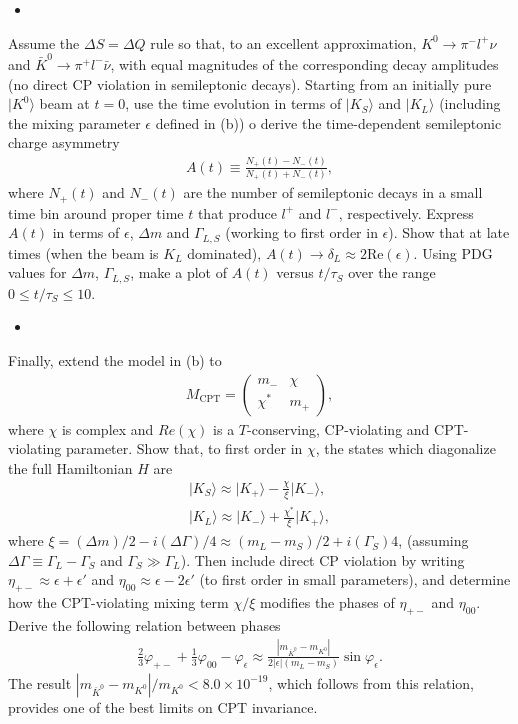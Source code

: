 \begin{itemize}
    \item [(c)]
\end{itemize}
Assume the $\Delta S = \Delta Q$ rule so that, to an excellent approximation, $K^0\to \pi^- l^+ \nu$ and $\bar{K}^0\to \pi^+ l^- \bar{\nu}$, with equal magnitudes of the corresponding decay amplitudes (no direct CP violation in semileptonic decays). Starting from an initially pure $|K^0\rangle$ beam at $t=0$, use the time evolution in terms of $|K_S\rangle$ and $|K_L\rangle$ (including the mixing parameter $\epsilon$ defined in (b)) o derive the time-dependent semileptonic charge asymmetry 
\begin{align}
    A(t)\equiv \frac{N_+(t)-N_-(t)}{N_+(t)+N_-(t)},
\end{align}
where $N_+(t)$ and $N_-(t)$ are the number of semileptonic decays in a small time bin around proper time $t$ that produce $l^+$ and $l^-$, respectively. Express $A(t)$ in terms of $\epsilon$, $\Delta m$ and $\Gamma_{L,S}$ (working to first order in $\epsilon$). Show that at late times (when the beam is $K_L$ dominated), $A(t)\to\delta_L\approx 2\text{Re}(\epsilon)$. Using PDG values for $\Delta m$, $\Gamma_{L,S}$, make a plot of $A(t)$ versus $t/\tau_S$ over the range $0\leq t/\tau_S \leq 10$.

\begin{itemize}
    \item [(d)]
\end{itemize}
Finally, extend the model in (b) to 
\begin{align}
    M_{\text{CPT}}= \begin{pmatrix}
        m_- & \chi\\
        \chi^* & m_+
    \end{pmatrix},
\end{align}
where $\chi$ is complex and $Re(\chi)$ is a $T$-conserving, CP-violating and CPT-violating parameter. Show that, to first order in $\chi$, the states which diagonalize the full Hamiltonian $H$ are 
\begin{align}
    |K_S\rangle \approx |K_+\rangle -\frac{\chi}{\xi} |K_-\rangle, \\
    |K_L\rangle \approx |K_-\rangle +\frac{\chi^*}{\xi} |K_+\rangle,
\end{align}
where $\xi=(\Delta m)/2-i(\Delta \Gamma)/4\approx (m_L-m_S)/2+i(\Gamma_S)4$, (assuming $\Delta\Gamma\equiv \Gamma_L-\Gamma_S$ and $\Gamma_S\gg \Gamma_L$). Then include direct CP violation by writing $\eta_{+-}\approx \epsilon + \epsilon'$ and $\eta_{00}\approx \epsilon - 2\epsilon'$ (to first order in small parameters), and determine how the CPT-violating mixing term $\chi/\xi$ modifies the phases of $\eta_{+-}$ and $\eta_{00}$. Derive the following relation between phases 
\begin{align}
    \frac{2}{3} \varphi_{+-} + \frac{1}{3} \varphi_{00} - \varphi_\epsilon \approx \frac{|m_{\bar{K}^0}-m_{K^0}|}{2|\epsilon|(m_L-m_S)}\sin\varphi_\epsilon.
\end{align}
The result $|m_{\bar{K}^0}-m_{K^0}|/m_{K^0}<8.0\times 10^{-19}$, which follows from this relation, provides one of the best limits on CPT invariance.


